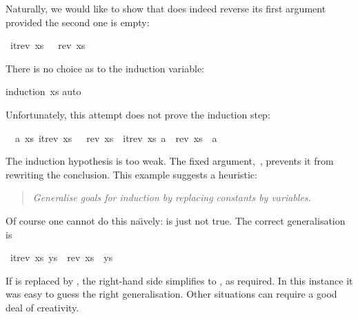 \begin{isabellebody}
\begin{isamarkuptext}
Naturally, we would like to show that  does indeed reverse
its first argument provided the second one is empty:%
\end{isamarkuptext}%
\isamarkuptrue%
\isamarkupfalse%
\ {}itrev\ xs\ {}{}\ {}\ rev\ xs{}%
\isadelimproof
%
\endisadelimproof
%
\isatagproof
%
\begin{isamarkuptxt}%
There is no choice as to the induction variable:%
\end{isamarkuptxt}%
\isamarkuptrue%
\isamarkupfalse%
{}induction\ xs{}\isanewline
{}\isamarkupfalse%
{}auto{}%
\begin{isamarkuptxt}%
Unfortunately, this attempt does not prove
the induction step:
\begin{isabelle}%
\ {}{}\ {}a\ xs{}\ itrev\ xs\ {}{}\ {}\ rev\ xs\ {}\ itrev\ xs\ {}a{}\ {}\ rev\ xs\ {}\ {}a{}%
\end{isabelle}
The induction hypothesis is too weak.  The fixed
argument,~, prevents it from rewriting the conclusion.  
This example suggests a heuristic:
\begin{quote}
\emph{Generalise goals for induction by replacing constants by variables.}
\end{quote}
Of course one cannot do this na\"{\i}vely:  is
just not true.  The correct generalisation is%
\end{isamarkuptxt}%
\isamarkuptrue%
%
\endisatagproof
{\isafoldproof}%
%
\isadelimproof
%
\endisadelimproof
{}\isamarkupfalse%
\ {}itrev\ xs\ ys\ {}\ rev\ xs\ {}\ ys{}%
\isadelimproof
%
\endisadelimproof
%
\isatagproof
%
\begin{isamarkuptxt}%
If  is replaced by , the right-hand side simplifies to
, as required.
In this instance it was easy to guess the right generalisation.
Other situations can require a good deal of creativity.  


\end{isamarkuptxt}
\end{isabellebody}
